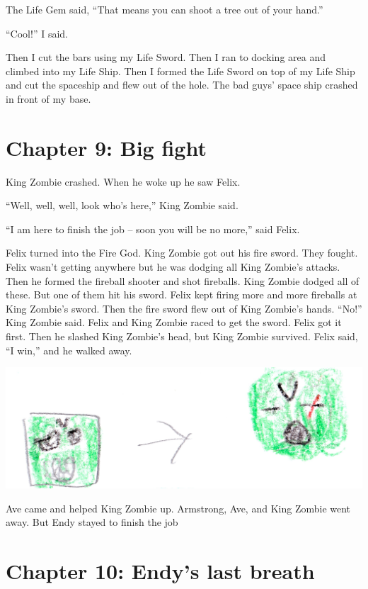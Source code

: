\documentclass[12pt,oneside]{krantz}
\begin{document}
The Life Gem said, ``That means you can shoot a tree out of your hand.''

``Cool!'' I said.

Then I cut the bars using my Life Sword. Then I ran to docking area and
climbed into my Life Ship. Then I formed the Life Sword on top of my
Life Ship and cut the spaceship and flew out of the hole. The bad guys'
space ship crashed in front of my base.

\hypertarget{chapter-9-big-fight}{%
\chapter*{Chapter 9: Big fight}\label{chapter-9-big-fight}}


King Zombie crashed. When he woke up he saw Felix.

``Well, well, well, look who's here,'' King Zombie said.

``I am here to finish the job -- soon you will be no more,'' said Felix.

Felix turned into the Fire God. King Zombie got out his fire sword. They
fought. Felix wasn't getting anywhere but he was dodging all King
Zombie's attacks. Then he formed the fireball shooter and shot
fireballs. King Zombie dodged all of these. But one of them hit his
sword. Felix kept firing more and more fireballs at King Zombie's sword.
Then the fire sword flew out of King Zombie's hands. ``No!'' King Zombie
said. Felix and King Zombie raced to get the sword. Felix got it first.
Then he slashed King Zombie's head, but King Zombie survived. Felix
said, ``I win,'' and he walked away.

\includegraphics[width=6.25in,height=\textheight]{img/greenheads.jpg}

Ave came and helped King Zombie up. Armstrong, Ave, and King Zombie went
away. But Endy stayed to finish the job

\hypertarget{chapter-10-endys-last-breath}{%
\chapter*{Chapter 10: Endy's last
breath}\label{chapter-10-endys-last-breath}}
\end{document}
